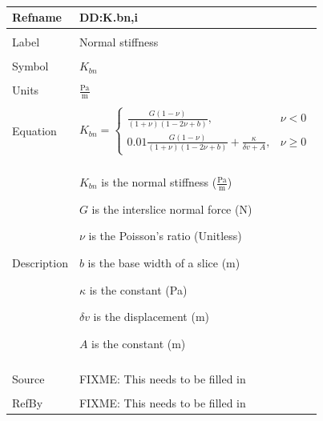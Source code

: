 \documentclass[12pt]{article}
\begin{document}
~\newline
\noindent \begin{minipage}{\textwidth}
\begin{tabular}{p{} p{}}
\toprule \textbf{Refname} & \textbf{DD:K.bn,i}
\label{DD:K.bn,i}
\\ \midrule \\
Label & Normal stiffness
\\ \midrule \\
Symbol & ${K_{bn}}$
\\ \midrule \\
Units & $\frac{\text{Pa}}{\text{m}}$
\\ \midrule \\
Equation & \begin{dmath}
           {K_{bn}}=\begin{cases}
\frac{G \left(1-ν\right)}{\left(1+ν\right) \left(1-2 ν+b\right)}, & ν<0\\
0.01 \frac{G \left(1-ν\right)}{\left(1+ν\right) \left(1-2 ν+b\right)}+\frac{κ}{δv+A}, & ν\geq{}0
\end{cases}
           \end{dmath}
\\ \midrule \\
Description & \begin{symbDescription}
              \item{${K_{bn}}$ is the normal stiffness ($\frac{\text{Pa}}{\text{m}}$)}
              \item{$G$ is the interslice normal force (N)}
              \item{$ν$ is the Poisson's ratio (Unitless)}
              \item{$b$ is the base width of a slice (m)}
              \item{$κ$ is the constant (Pa)}
              \item{$δv$ is the displacement (m)}
              \item{$A$ is the constant (m)}
              \end{symbDescription}
\\ \midrule \\
Source & FIXME: This needs to be filled in
\\ \midrule \\
RefBy & FIXME: This needs to be filled in
\\ \bottomrule \end{tabular}
\end{minipage}\\
\end{document}

